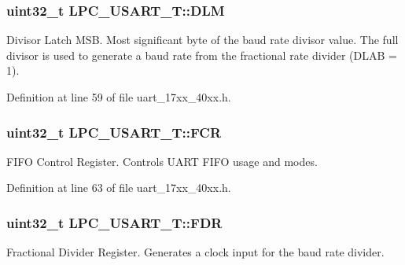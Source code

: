 \subsubsection[{\texorpdfstring{D\+LM}{DLM}}]{ uint32\+\_\+t L\+P\+C\+\_\+\+U\+S\+A\+R\+T\+\_\+\+T\+::\+D\+LM}\hypertarget{structLPC__USART__T_a3e9b4b467fbbf43e57e261fd826e5e97}{}\label{structLPC__USART__T_a3e9b4b467fbbf43e57e261fd826e5e97}
Divisor Latch M\+SB. Most significant byte of the baud rate divisor value. The full divisor is used to generate a baud rate from the fractional rate divider (D\+L\+AB = 1). 

Definition at line 59 of file uart\+\_\+17xx\+\_\+40xx.\+h.

\subsubsection[{\texorpdfstring{F\+CR}{FCR}}]{ uint32\+\_\+t L\+P\+C\+\_\+\+U\+S\+A\+R\+T\+\_\+\+T\+::\+F\+CR}\hypertarget{structLPC__USART__T_a01d439a681b9a7a486ad75c91a2f91c8}{}\label{structLPC__USART__T_a01d439a681b9a7a486ad75c91a2f91c8}
F\+I\+FO Control Register. Controls U\+A\+RT F\+I\+FO usage and modes. 

Definition at line 63 of file uart\+\_\+17xx\+\_\+40xx.\+h.

\subsubsection[{\texorpdfstring{F\+DR}{FDR}}]{ uint32\+\_\+t L\+P\+C\+\_\+\+U\+S\+A\+R\+T\+\_\+\+T\+::\+F\+DR}\hypertarget{structLPC__USART__T_ae35ac03aeeafd5a54f2c2c675b6dca4f}{}\label{structLPC__USART__T_ae35ac03aeeafd5a54f2c2c675b6dca4f}
Fractional Divider Register. Generates a clock input for the baud rate divider. 

